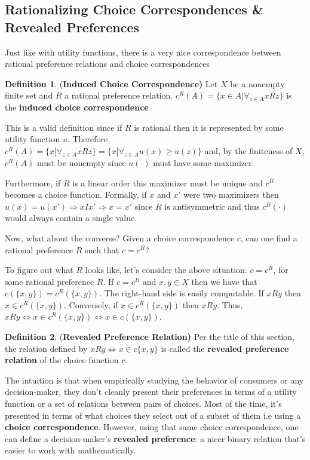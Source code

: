 \documentclass[12pt]{article}
\theoremstyle{plain}
\theoremstyle{definition}
\newtheorem{defin}{Definition}[subsection]
\theoremstyle{remark}
\newcommand{\tn}[1]{\textnormal{#1}}
\newcommand{\3}{\vspace*{3mm}}
\newcommand{\name}[1]{\tn{(\textbf{#1)}}}
\newcommand{\RIGHT}{\Longrightarrow}
\newcommand{\IFF}{\Longleftrightarrow}
\begin{document}
\subsection{Rationalizing Choice Correspondences \& Revealed Preferences}

Just like with utility functions, there is a very nice correspondence between rational preference relations and choice correspondences 
\begin{defin} \name{Induced Choice Correspondence}
Let $X$ be a nonempty finite set and $R$ a rational preference relation. $c^R(A)  = \{x \in A | {\forall}_{z \in A} x R z\}$ is the \textbf{induced choice correspondence}
\end{defin}

This is a valid definition since if $R$ is rational then it is represented by some utility function $u$. Therefore, $c^R(A)  = \{x | {\forall}_{z \in A} x R z\} =  \{x | {\forall}_{z \in A} u(x) \geq u(z)\} $ and, by the finiteness of $X$, $c^R(A)$ must be nonempty since $u(\cdot)$ must have some maximizer. 


Furthermore, if $R$ is a linear order this maximizer must be unique and $c^R$ becomes a choice function. Formally, if $x$ and $x'$ were two maximizers then $u(x) = u(x') \RIGHT x I x' \RIGHT x = x'$ since $R$ is antisymmetric and thus $c^R(\cdot)$ would always contain a single value. 


Now, what about the converse? Given a choice correspondence $c$, can one find a rational preference $R$ such that $c = c^R$? 

To figure out what $R$ looks like, let's consider the above situation: $c = c^R$, for some rational preference $R$. If $c = c^R$ and $x, y \in X$ then we have that $c(\{x,y\}) = c^R(\{x,y\})$. The right-hand side is easily computable. If $x R y$ then $x \in c^R(\{x,y\})$. Conversely, if $x \in c^R(\{x,y\})$ then $x R y$. Thus, $x R y \IFF x \in c^R(\{x,y\}) \IFF x \in c(\{x,y\})$. 

\begin{defin}\name{Revealed Preference Relation}
Per the title of this section, the relation defined by $x R y \IFF x \in c\{x,y\}$ is called the \textbf{revealed preference relation} of the choice function $c$.

\end{defin}

The intuition is that when empirically studying the behavior of consumers or any decision-maker, they don't cleanly present their preferences in terms of a utility function or a set of relations between pairs of choices. Most of the time, it's presented in terms of what choices they select out of a subset of them i.e using a \textbf{choice correspondence}. However, using that same choice correspondence, one can define a decision-maker's \textbf{revealed preference}: a nicer binary relation that's easier to work with mathematically.
\end{document}
